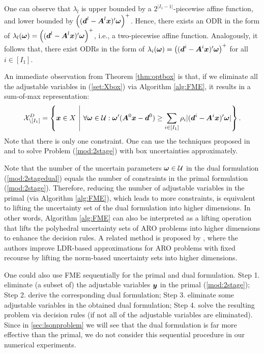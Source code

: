 \documentclass[fleqn,isre,blindrev]{informs4}
\newcommand{\mb}[1]{\mbox{\boldmath \ensuremath{#1}}}
\begin{document}
	One can observe that $\lambda_l$ is upper bounded by a $2^{|I_1-1|}$-piecewise affine function, and lower bounded by $\left((\mb{d}^l- \mb{A}^l\mb{x})'\mb{\omega}\right)^+$. Hence, there exists an ODR in the form of $\lambda_l(\mb{\omega})=\left((\mb{d}^l- \mb{A}^l\mb{x})'\mb{\omega}\right)^+$, i.e., a two-piecewise affine function. Analogously, it follows that, there exist ODRs in the form of  $\lambda_i(\mb{\omega})=\left((\mb{d}^i- \mb{A}^i\mb{x})'\mb{\omega}\right)^+$ for all $i\in [I_1]$.   \hfill \Halmos
	
	An immediate observation from Theorem \ref{thm:optbox} is that, if we eliminate all the adjustable variables in (\ref{set:Xbox}) via Algorithm \ref{alg:FME}, it results in a sum-of-max representation:
\begin{equation*}
		\mathcal{X}^D_{\setminus [I_1]}=  \left\{ \mb{x} \in X \enskip \vline \enskip \forall \mb{\omega} \in \mathcal{U}:  \mb{\omega}' (\mb{A}^0\mb{x}-\mb{d}^0)  \ge 	 \sum_{i \in [I_1]}  \rho_i|(\mb{d}^i- \mb{A}^i\mb{x})'\mb{\omega}| 		\right\}.
\end{equation*}
	Note that there is only one constraint. One can use the techniques proposed in \cite{gd13} and \cite{ad16b} to solve Problem (\ref{mod:2stage}) with box uncertainties approximately. 

	 {Note that the number of the uncertain parameters $\mb{\omega}\in \mathcal{U}$ in the dual formulation (\ref{mod:2stagedual}) equals the number of constraints in the primal formulation (\ref{mod:2stage}). Therefore, reducing the number of adjustable variables in the primal (via Algorithm \ref{alg:FME}), which leads to more constraints, is equivalent to lifting the uncertainty set of the dual formulation into higher dimensions. In other words, Algorithm \ref{alg:FME} can also be interpreted as a lifting operation that lifts the polyhedral uncertainty sets of ARO problems into higher dimensions to enhance the decision rules. A related method is proposed by \cite{cz09}, where the authors improve LDR-based approximations for ARO problems with fixed recourse by lifting the norm-based uncertainty sets into higher dimensions. 
		
    One could also use FME sequentially for the primal and dual formulation. Step 1. eliminate (a subset of) the adjustable variables $\mb{y}$ in the primal (\ref{mod:2stage}); Step 2. derive the corresponding dual formulation; Step 3.  eliminate some adjustable variables in the obtained dual formulation; Step 4. solve the resulting problem via decision rules (if not all of the adjustable variables are eliminated). Since in \textsection \ref{sec:lsonproblem} we will see that the dual formulation is far more effective than the primal, we do not consider this sequential procedure in our numerical experiments.}
	
\end{document}
